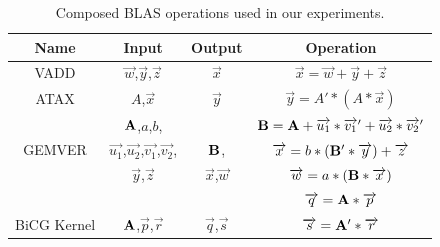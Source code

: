 \documentclass[runningheads]{llncs}
\begin{document}
\begin{table}[htb] 
\caption{Composed BLAS operations used in our experiments.}
\label{tbl:blas-ops}
\small
\centering 
\begin{tabular}{|c|c|c|c|} 
\hline 
Name & Input & Output & Operation  \\ 
\hline 
\hline 
VADD & $\overrightarrow{w}$,$\overrightarrow{y}$,$\overrightarrow{z}$ & $\overrightarrow{x}$ &
$\overrightarrow{x} = \overrightarrow{w} + \overrightarrow{y} + \overrightarrow{z}$ \\ [1ex]
\hline 
ATAX & $A$,$\overrightarrow{x}$ & $\overrightarrow{y}$ & 
$\overrightarrow{y} = A' * (A * \overrightarrow{x})$ \\ [1ex]
\hline 
 & ${\bf A}$,$a$,$b$, &  & ${\bf B} = {\bf A} + \overrightarrow{u_1} * \overrightarrow{v_1}' + \overrightarrow{u_2} * \overrightarrow{v_2}'$\\
GEMVER & $\overrightarrow{u_1}$,$\overrightarrow{u_2}$,$\overrightarrow{v_1}$,$\overrightarrow{v_2}$, & ${\bf B}$,  & $\overrightarrow{x} = b * ({\bf B}' * \overrightarrow{y}) + \overrightarrow{z}$\\
& $\overrightarrow{y}$,$\overrightarrow{z}$ & $\overrightarrow{x}$,$\overrightarrow{w}$ & $\overrightarrow{w} = a * ({\bf B} * \overrightarrow{x})$\\ [1ex]
\hline 
& & & $\overrightarrow{q} = {\bf A} * \overrightarrow{p}$ \\
BiCG Kernel & ${\bf A}$,$\overrightarrow{p}$,$\overrightarrow{r}$ & $\overrightarrow{q}$,$\overrightarrow{s}$ & $\overrightarrow{s} = {\bf A}' * \overrightarrow{r}$\\ [1ex]
\hline 
\end{tabular} 
\vspace{-.1in} 
\end{table} 
\end{document}
